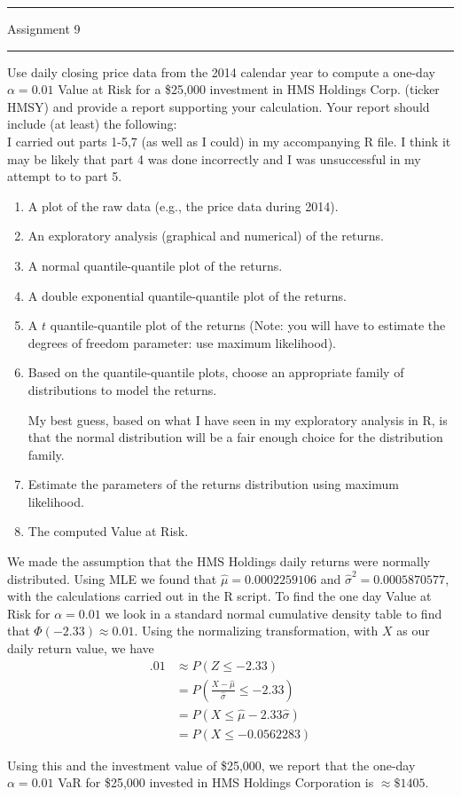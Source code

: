 \documentclass[letterpaper,12pt,fleqn]{article}
\begin{document}
\pagestyle{empty}

\hrule \vspace{0.5em}
 \hfill Assignment 9 \newline \hrule

\vspace{1em}

Use daily closing price data from the 2014 calendar year to compute a one-day $\alpha = 0.01$ Value at Risk for a \$25,000 investment in HMS Holdings Corp. (ticker HMSY) and provide a report supporting your calculation.  Your report should include (at least) the following:
\\

I carried out parts 1-5,7 (as well as I could) in my accompanying R file. I think it may be likely that part 4 was done incorrectly and I was unsuccessful in my attempt to to part 5.
\begin{enumerate}
\item A plot of the raw data (e.g., the price data during 2014).

\item An exploratory analysis (graphical and numerical) of the returns.

\item A normal quantile-quantile plot of the returns.

\item A double exponential quantile-quantile plot of the returns.

\item A $t$ quantile-quantile plot of the returns (Note: you will have to estimate the degrees of freedom parameter: use maximum likelihood).

\item Based on the quantile-quantile plots, choose an appropriate family of distributions to model the returns.

My best guess, based on what I have seen in my exploratory analysis in R, is that the normal distribution will be a fair enough choice for the distribution family.

\item Estimate the parameters of the returns distribution using maximum likelihood.

\item The computed Value at Risk.
\end{enumerate}

We made the assumption that the HMS Holdings daily returns were normally distributed. Using MLE we found that $\hat{\mu} = 0.0002259106$ and $\hat{\sigma}^2 = 0.0005870577$, with the calculations carried out in the R script. To find the one day Value at Risk for $\alpha = 0.01$ we look in a standard normal cumulative density table to find that $\Phi(-2.33) \approx 0.01$. Using the normalizing transformation, with $X$ as our daily return value, we have
\begin{align*}
.01 &\approx P(Z \leq -2.33)\\
&= P(\frac{X-\hat{\mu}}{\hat{\sigma}} \leq -2.33) \\
&= P(X \leq \hat{\mu} -2.33\hat{\sigma})\\
&= P(X \leq -0.0562283) 
\end{align*}

Using this and the investment value of \$25,000, we report that the one-day $\alpha = 0.01$ VaR for \$25,000 invested in HMS Holdings Corporation is $\approx \$1405$.
\end{document}
